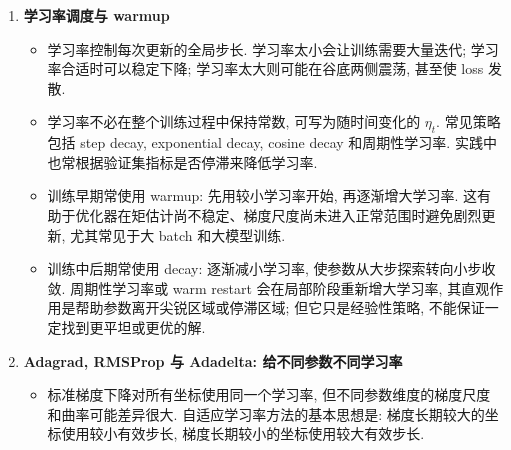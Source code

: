 \documentclass{../nndlcourse}
\begin{document}
\begin{enumerate}
\begin{itemize}
      \[
        \frac{1}{MK}\sum_{i=1}^{MK}\boldsymbol{g}
        \approx
        \boldsymbol{g}.
      \]
      记对应学习率为 $\tilde{\alpha}$, 则一个 epoch 的参数位移约为
      \[
        \Delta\boldsymbol{\theta}_{\mathrm{large}}
        \approx
        -\tilde{\alpha}\boldsymbol{g}.
      \]
      如果希望两种 batch size 在使用同样多样本后产生相近的参数位移, 就令
      \[
        -\tilde{\alpha}\boldsymbol{g}
        \approx
        -M\alpha\boldsymbol{g},
        \qquad
        \tilde{\alpha}\approx M\alpha.
      \]
      这正是 batch size 扩大 $M$ 倍时学习率也扩大 $M$ 倍的线性缩放规则.
      \item 需要注意, 上面的推导比较的是参数位移, 不是“梯度本身变大了 $M$ 倍”. 在常见实现中, batch 梯度是样本梯度的平均值, batch size 从 $K$ 变为 $MK$ 后, 平均梯度的尺度仍近似为 $\boldsymbol{g}$; 学习率变大的理由是小 batch 在同一个 epoch 内原本会走 $M$ 步, 大 batch 只走 $1$ 步. 这个推导还依赖“短时间内梯度变化不大”、优化器近似为普通 SGD、不同 batch 看到的方向相近等近似, 在训练初期或学习率很大时未必成立. 所以大 batch 训练常配合 learning rate warmup: 先用较小学习率启动, 再逐渐升到目标学习率, 以避免随机初始化阶段的大梯度和大学习率共同造成不稳定.
    \end{itemize}
  \item \textbf{学习率调度与 warmup}
    \begin{itemize}
      \item 学习率控制每次更新的全局步长. 学习率太小会让训练需要大量迭代; 学习率合适时可以稳定下降; 学习率太大则可能在谷底两侧震荡, 甚至使 loss 发散.
      \item 学习率不必在整个训练过程中保持常数, 可写为随时间变化的 $\eta_t$. 常见策略包括 step decay, exponential decay, cosine decay 和周期性学习率. 实践中也常根据验证集指标是否停滞来降低学习率.
      \item 训练早期常使用 warmup: 先用较小学习率开始, 再逐渐增大学习率. 这有助于优化器在矩估计尚不稳定、梯度尺度尚未进入正常范围时避免剧烈更新, 尤其常见于大 batch 和大模型训练.
      \item 训练中后期常使用 decay: 逐渐减小学习率, 使参数从大步探索转向小步收敛. 周期性学习率或 warm restart 会在局部阶段重新增大学习率, 其直观作用是帮助参数离开尖锐区域或停滞区域; 但它只是经验性策略, 不能保证一定找到更平坦或更优的解.
    \end{itemize}
  \item \textbf{Adagrad, RMSProp 与 Adadelta: 给不同参数不同学习率}
    \begin{itemize}
      \item 标准梯度下降对所有坐标使用同一个学习率, 但不同参数维度的梯度尺度和曲率可能差异很大. 自适应学习率方法的基本思想是: 梯度长期较大的坐标使用较小有效步长, 梯度长期较小的坐标使用较大有效步长.

\end{itemize}
\end{enumerate}
\end{document}
